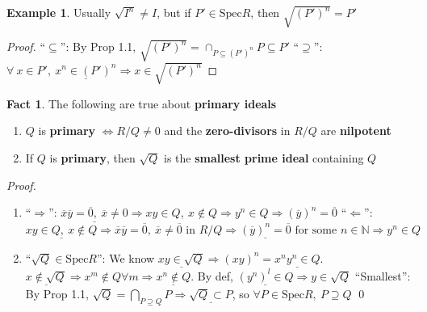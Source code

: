 \documentclass[12pt,a4paper]{article}
\theoremstyle{definition}
\newtheorem{fact}{Fact}
\newtheorem{example}{Example}
\begin{document}
\newpage

\begin{example}
  Usually $\sqrt{I^n} \neq I$, but if \underline{$P' \in \text{Spec}R$}, then $\boxed{\sqrt{(P')^n} = P'}$
\end{example}

\begin{proof}
  ``$\subseteq$'': By Prop 1.1, $\boxed{\sqrt{(P')^n} = \cap_{P \subseteq (P')^n} P} \subseteq P'$ \newline
  ``$\supseteq$'': $\forall\ x \in P',\ \underline{x^n \in (P')^n} \Rightarrow x \in \sqrt{(P')^n}$
\end{proof}
\vspace{0.125em}

\begin{fact}
  The following are true about \textbf{primary ideals}
  \begin{enumerate} [(1)]
    \item $Q$ is \textbf{primary} $\Leftrightarrow R/Q \neq 0$ and the \textbf{zero-divisors} in $R/Q$ are \textbf{nilpotent}
    \item If $Q$ is \textbf{primary}, then $\sqrt{Q}$ is the \textbf{smallest prime ideal} containing $Q$
  \end{enumerate}
\end{fact}

\noindent\textit{Proof.}
\begin{enumerate} [(1)]
  \item ``$\Rightarrow$'': $\underline{\overline{x}\overline{y} = \overline{0},\ \overline{x} \neq 0} \Rightarrow xy \in Q,\ x \notin Q \Rightarrow y^n \in Q \Rightarrow \boxed{(\overline{y})^n = \overline{0}}$ \newline
  ``$\Leftarrow$'': $\underline{xy \in Q,\ x \notin Q} \Rightarrow \overline{x}\overline{y} = \overline{0},\ \overline{x} \neq \overline{0} \text{ in } R/Q \Rightarrow \underline{(\overline{y})^n = \overline{0}} \text{ for some } n \in \mathbb{N} \Rightarrow \boxed{y^n \in Q}$
  \item ``$\sqrt{Q} \in \text{Spec}R$'': We know $\underline{xy \in \sqrt{Q}} \Rightarrow (xy)^n = \underline{x^n y^n \in Q}$. $\underline{x \notin \sqrt{Q}} \Rightarrow x^m \notin Q \forall m \Rightarrow \underline{x^n \notin Q}$. By def, $\underline{(y^n)^l \in Q} \Rightarrow y \in \sqrt{Q}$\newline\newline
  ``Smallest'': By Prop 1.1, $\sqrt{Q} = \bigcap_{P \supseteq Q} P \Rightarrow \underline{\sqrt{Q} \subset P}$, so $\forall P \in \text{Spec}R,\ P \supseteq Q$ \qed
\end{enumerate}
\vspace{0.125em}
\end{document}
